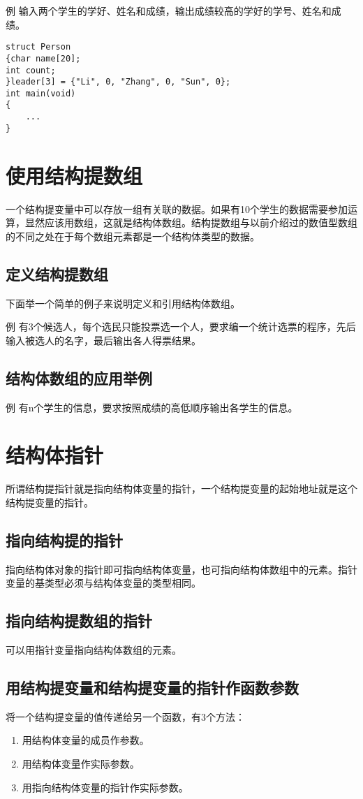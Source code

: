 例 输入两个学生的学好、姓名和成绩，输出成绩较高的学好的学号、姓名和成绩。
\begin{lstlisting}
struct Person
{char name[20];
int count;
}leader[3] = {"Li", 0, "Zhang", 0, "Sun", 0};
int main(void)
{
	...
}
\end{lstlisting}
\section{使用结构提数组}
一个结构提变量中可以存放一组有关联的数据。如果有10个学生的数据需要参加运算，显然应该用数组，这就是结构体数组。结构提数组与以前介绍过的数值型数组的不同之处在于每个数组元素都是一个结构体类型的数据。
\subsection{定义结构提数组}
下面举一个简单的例子来说明定义和引用结构体数组。

例 有3个候选人，每个选民只能投票选一个人，要求编一个统计选票的程序，先后输入被选人的名字，最后输出各人得票结果。
\subsection{结构体数组的应用举例}
例 有n个学生的信息，要求按照成绩的高低顺序输出各学生的信息。
\section{结构体指针}
所谓结构提指针就是指向结构体变量的指针，一个结构提变量的起始地址就是这个结构提变量的指针。
\subsection{指向结构提的指针}
指向结构体对象的指针即可指向结构体变量，也可指向结构体数组中的元素。指针变量的基类型必须与结构体变量的类型相同。
\subsection{指向结构提数组的指针}
可以用指针变量指向结构体数组的元素。
\subsection{用结构提变量和结构提变量的指针作函数参数}
将一个结构提变量的值传递给另一个函数，有3个方法：
\begin{enumerate}
	\item 用结构体变量的成员作参数。
	\item 用结构体变量作实际参数。
	\item 用指向结构体变量的指针作实际参数。
\end{enumerate}
